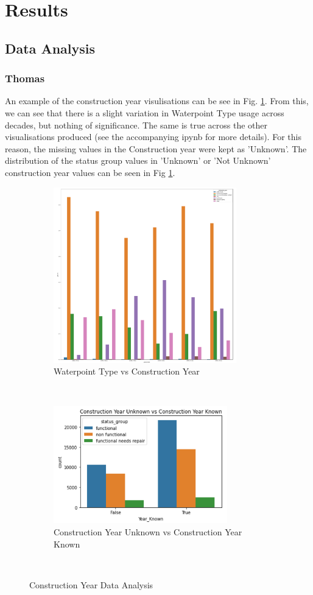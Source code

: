 \documentclass[conference]{IEEEtran}
\begin{document}
\section{Results} \label{ref:results}

\subsection{Data Analysis}

\subsubsection{Thomas}

An example of the construction year visulisations can be see in Fig. \ref{fig:construction_year}. From this, we can see that there is a slight variation in Waterpoint Type usage across decades, but nothing of significance. The same is true across the other visualisations produced (see the accompanying ipynb for more details). For this reason, the missing values in the Construction year were kept as 'Unknown'. The distribution of the status group values in 'Unknown' or 'Not Unknown' construction year values can be seen in Fig \ref{fig:construction_year}.

\begin{figure}[t!]
    \centering
    \begin{subfigure}[t]{0.5\textwidth}
      \centering
      \includegraphics[height=3in]{figures/tom_da_construction_year_1}
      \caption{Waterpoint Type vs Construction Year}
    \end{subfigure}%
    ~
    \begin{subfigure}[t]{0.5\textwidth}
      \centering
      \includegraphics[height=2in]{figures/tom_unknown_cy.png}
      \caption{Construction Year Unknown vs Construction Year Known}
    \end{subfigure}
    ~
    \caption{Construction Year Data Analysis}
    \label{fig:construction_year}
\end{figure}
\end{document}
